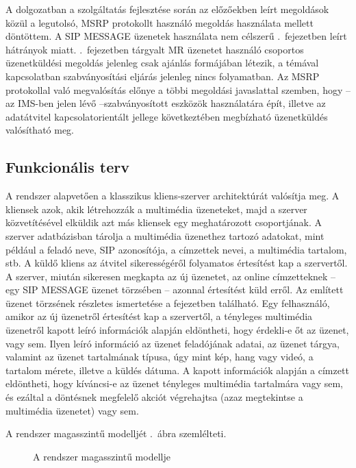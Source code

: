 \medskip

A dolgozatban a szolgáltatás fejlesztése során az előzőekben leírt megoldások közül a legutolsó, MSRP protokollt használó megoldás használata mellett döntöttem. A SIP MESSAGE üzenetek használata nem célszerű .~fejezetben leírt hátrányok miatt. .~fejezetben tárgyalt MR üzenetet használó csoportos üzenetküldési megoldás jelenleg csak ajánlás formájában létezik, a témával kapcsolatban szabványosítási eljárás jelenleg nincs folyamatban. Az MSRP protokollal való megvalósítás előnye a többi megoldási javaslattal szemben, hogy -- az IMS-ben jelen lévő --szabványosított eszközök használatára épít, illetve az adatátvitel kapcsolatorientált jellege következtében megbízható üzenetküldés valósítható meg. 

\subsection{Funkcionális terv}

A rendszer alapvetően a klasszikus kliens-szerver architektúrát valósítja meg. A kliensek azok, akik létrehozzák a multimédia üzeneteket, majd a szerver közvetítésével elküldik azt más kliensek egy meghatározott csoportjának. A szerver adatbázisban tárolja a multimédia üzenethez tartozó adatokat, mint például a feladó neve, SIP azonosítója, a címzettek nevei, a multimédia tartalom, stb. A küldő kliens az átvitel sikerességéről folyamatos értesítést kap a szervertől. A szerver, miután sikeresen megkapta az új üzenetet, az online címzetteknek -- egy SIP MESSAGE üzenet törzsében -- azonnal értesítést küld erről. Az említett üzenet törzsének részletes ismertetése a  fejezetben található. Egy felhasználó, amikor az új üzenetről értesítést kap a szervertől, a tényleges multimédia üzenetről kapott leíró információk alapján eldöntheti, hogy érdekli-e őt az üzenet, vagy sem. Ilyen leíró információ az üzenet feladójának adatai, az üzenet tárgya, valamint az üzenet tartalmának típusa, úgy mint kép, hang vagy videó, a tartalom mérete, illetve a küldés dátuma. A kapott információk alapján a címzett eldöntheti, hogy kíváncsi-e az üzenet tényleges multimédia tartalmára vagy sem, és ezáltal a döntésnek megfelelő akciót végrehajtsa (azaz megtekintse a multimédia üzenetet) vagy sem. 

A rendszer magasszintű modelljét .~ábra szemlélteti.

\begin{figure}[htbp]
\center
{}
\caption{A rendszer magasszintű modellje}
\label{fig:model}
\end{figure}

